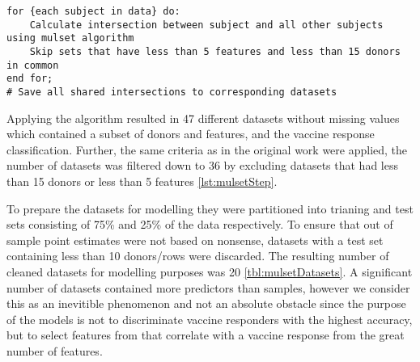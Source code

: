 \begin{lstlisting}[caption=Applying the mulset algorithm, label={lst:mulsetStep}]
% Step 1: generate re-sampled intersection datasets suitable for analysis
for {each subject in data} do:
	Calculate intersection between subject and all other subjects using mulset algorithm
	Skip sets that have less than 5 features and less than 15 donors in common
end for;
# Save all shared intersections to corresponding datasets
\end{lstlisting}

Applying the algorithm resulted in 47 different datasets without missing values
which contained a subset of donors and features, and the vaccine response
classification. Further, the same criteria as in the original work were
applied, the number of datasets was filtered down to 36 by excluding datasets
that had less than 15 donors or less than 5 features \autoref{lst:mulsetStep}.

To prepare the datasets for modelling they were partitioned into trianing and
test sets consisting of 75\% and 25\% of the data respectively. To ensure that
out of sample point estimates were not based on nonsense, datasets with a test
set containing less than 10 donors/rows were discarded. The resulting number of
cleaned datasets for modelling purposes was 20 \autoref{tbl:mulsetDatasets}. A
significant number of datasets contained more predictors than samples, however
we consider this as an inevitible phenomenon and not an absolute obstacle since
the purpose of the models is not to discriminate vaccine responders with the
highest accuracy, but to select features from that correlate with a vaccine
response from the great number of features.

